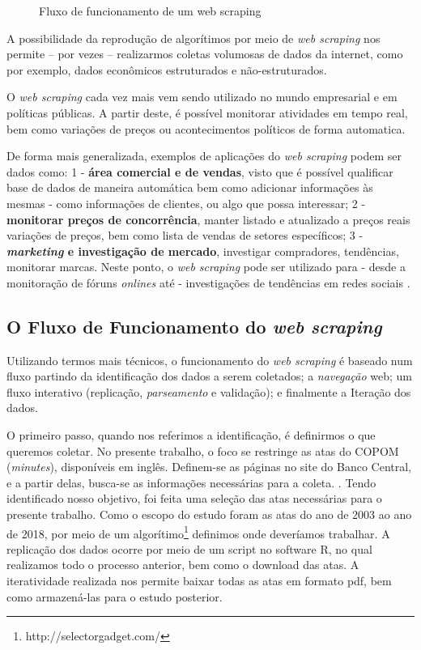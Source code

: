 \begin{figure}[!h]
    \centering
    \caption{Fluxo de funcionamento de um web scraping}
    
    \label{fig:webscraping}
\end{figure}

A possibilidade da reprodução de algorítimos por meio de \textit{web scraping} nos permite -- por vezes -- realizarmos coletas volumosas de dados da internet, como por exemplo, dados econômicos estruturados e não-estruturados. 

O \textit{web scraping} cada vez mais vem sendo utilizado no mundo empresarial e em políticas públicas. A partir deste, é possível monitorar atividades em tempo real, bem como variações de preços ou acontecimentos políticos de forma automatica.

De forma mais generalizada, exemplos de aplicações do \textit{web scraping} podem ser dados como: 1 - \textbf{área comercial e de vendas}, visto que é possível qualificar base de dados de maneira automática bem como adicionar informações às mesmas - como informações de clientes, ou algo que possa interessar; 2 - \textbf{monitorar preços de concorrência}, manter listado e atualizado a preços reais variações de preços, bem como lista de vendas de setores específicos; 3 - \textbf{\textit{marketing} e investigação de mercado}, investigar compradores, tendências, monitorar marcas. Neste ponto, o \textit{web scraping} pode ser utilizado para - desde a monitoração de fóruns \textit{onlines} até - investigações de tendências em redes sociais \cite{web2019utilidade}.

\subsection{O Fluxo de Funcionamento do \textit{web scraping}}

Utilizando termos mais técnicos, o funcionamento do \textit{web scraping} é baseado num fluxo partindo da identificação dos dados a serem coletados; a \textit{navegação} web; um fluxo interativo (replicação, \textit{parseamento} e validação); e finalmente a Iteração dos dados.\cite{web2019}

O primeiro passo, quando nos referimos a identificação, é definirmos o que queremos coletar. No presente trabalho, o foco se restringe as atas do COPOM (\textit{minutes}), disponíveis em inglês. Definem-se as páginas no site do Banco Central, e a partir delas, busca-se as informações necessárias para a coleta.  \cite{costa2016ensaios}. Tendo identificado nosso objetivo, foi feita uma seleção das atas necessárias para o presente trabalho. Como o escopo do estudo foram as atas do ano de 2003 ao ano de 2018, por meio de um algorítimo\footnote{http://selectorgadget.com/} definimos onde deveríamos trabalhar. A replicação dos dados ocorre por meio de um script no software R, no qual realizamos todo o processo anterior, bem como o download das atas. A iteratividade realizada nos permite baixar todas as atas em formato pdf, bem como armazená-las para o estudo posterior.


